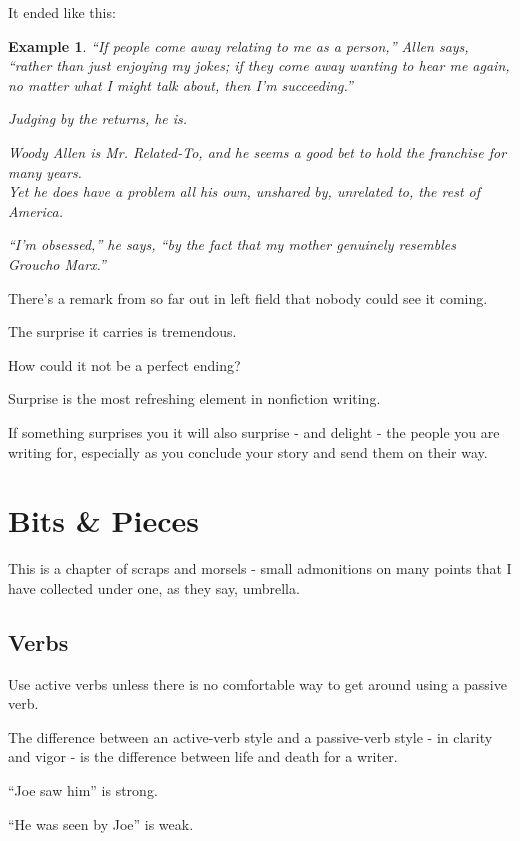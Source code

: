 \documentclass{book}
\numberwithin{equation}{section}
\newtheorem{example}{Example}[chapter]
\begin{document}
It ended like this:
\begin{example}
    ``If people come away relating to me as a person,'' Allen says, ``rather than just enjoying my jokes; if they come away wanting to hear me again, no matter what I might talk about, then I'm succeeding.''
    
    Judging by the returns, he is.
    
    Woody Allen is Mr. Related-To, and he seems a good bet to hold the franchise for many years.
    \\
    
    Yet he does have a problem all his own, unshared by, unrelated to, the rest of America.
    
    ``I'm obsessed,'' he says, ``by the fact that my mother genuinely resembles Groucho Marx.''
\end{example}
There's a remark from so far out in left field that nobody could see it coming.

The surprise it carries is tremendous.

How could it not be a perfect ending?

Surprise is the most refreshing element in nonfiction writing.

If something surprises you it will also surprise - and delight - the people you are writing for, especially as you conclude your story and send them on their way.


\chapter{Bits \& Pieces}

This is a chapter of scraps and morsels - small admonitions on many points that I have collected under one, as they say, umbrella.

\section{Verbs}
Use active verbs unless there is no comfortable way to get around using a passive verb.

The difference between an active-verb style and a passive-verb style - in clarity and vigor - is the difference between life and death for a writer.

%
``Joe saw him'' is strong.

``He was seen by Joe'' is weak.
\end{document}

